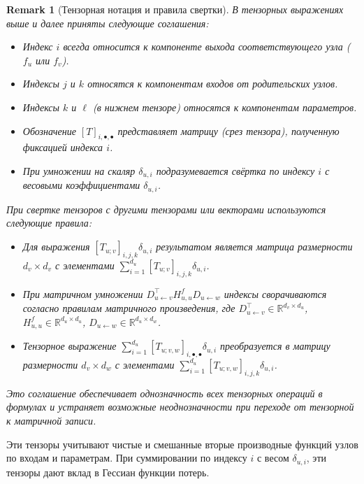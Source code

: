 \documentclass[11pt]{article}
\newtheorem{remark}{Remark}
\begin{document}
\begin{remark}[Тензорная нотация и правила свертки]
  В тензорных выражениях выше и далее приняты следующие соглашения:
  \begin{itemize}
    \item Индекс $i$ всегда относится к компоненте выхода соответствующего узла ($f_u$ или $f_v$).
    \item Индексы $j$ и $k$ относятся к компонентам входов от родительских узлов.
    \item Индексы $k$ и $\ell$ (в нижнем тензоре) относятся к компонентам параметров.
    \item Обозначение $[T]_{i,\bullet,\bullet}$ представляет матрицу (срез тензора), полученную фиксацией индекса $i$.
    \item При умножении на скаляр $\delta_{u,i}$ подразумевается свёртка по индексу $i$ с весовыми
      коэффициентами $\delta_{u,i}$.
  \end{itemize}

  При свертке тензоров с другими тензорами или векторами используются следующие правила:
  \begin{itemize}
    \item Для выражения $[T_{u;v}]_{i,j,k}\delta_{u,i}$ результатом является матрица размерности $d_v \times
      d_v$ с элементами $\sum_{i=1}^{d_u}[T_{u;v}]_{i,j,k}\delta_{u,i}$.
    \item При матричном умножении $D_{u\gets v}^\top H^f_{u,u} D_{u\gets w}$ индексы сворачиваются согласно
      правилам матричного произведения, где $D_{u\gets v}^\top \in \mathbb{R}^{d_v \times d_u}$, $H^f_{u,u}
      \in \mathbb{R}^{d_u \times d_u}$, $D_{u\gets w} \in \mathbb{R}^{d_u \times d_w}$.
    \item Тензорное выражение $\sum_{i=1}^{d_u}[T_{u;v,w}]_{i,\bullet,\bullet}\delta_{u,i}$ преобразуется в
      матрицу размерности $d_v \times d_w$ с элементами $\sum_{i=1}^{d_u}[T_{u;v,w}]_{i,j,k}\delta_{u,i}$.
  \end{itemize}

  Это соглашение обеспечивает однозначность всех тензорных операций в формулах и устраняет возможные
  неоднозначности при переходе от тензорной к матричной записи.
\end{remark}

Эти тензоры учитывают чистые и смешанные вторые производные функций узлов по входам и параметрам. При
суммировании по индексу $i$ с весом $\delta_{u,i}$, эти тензоры дают вклад в Гессиан функции потерь.
\end{document}
